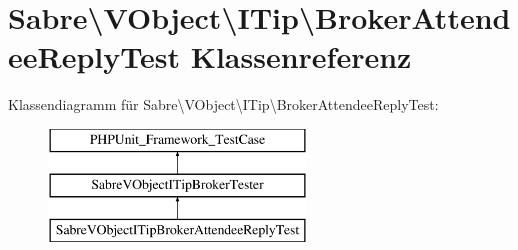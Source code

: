 \hypertarget{class_sabre_1_1_v_object_1_1_i_tip_1_1_broker_attendee_reply_test}{}\section{Sabre\textbackslash{}V\+Object\textbackslash{}I\+Tip\textbackslash{}Broker\+Attendee\+Reply\+Test Klassenreferenz}
\label{class_sabre_1_1_v_object_1_1_i_tip_1_1_broker_attendee_reply_test}
Klassendiagramm für Sabre\textbackslash{}V\+Object\textbackslash{}I\+Tip\textbackslash{}Broker\+Attendee\+Reply\+Test\+:\begin{figure}[H]
\begin{center}
\leavevmode
\includegraphics[height=3.000000cm]{class_sabre_1_1_v_object_1_1_i_tip_1_1_broker_attendee_reply_test}
\end{center}
\end{figure}
